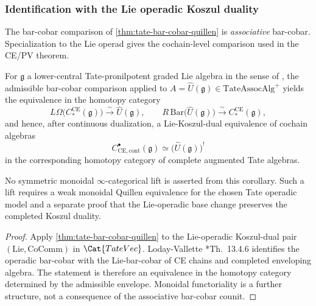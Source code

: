 \subsubsection{Identification with the Lie operadic Koszul duality}

The bar-cobar comparison of \ref{thm:tate-bar-cobar-quillen} is
\emph{associative} bar-cobar.  Specialization to the Lie operad
gives the cochain-level comparison used in the CE/PV theorem.

\begin{cor}
  \label{cor:tate-lie-bar-cobar}
  For $\mathfrak g$ a lower-central Tate-pronilpotent graded Lie algebra in the
  sense of \alpharef, the admissible bar-cobar comparison applied
  to $A=\widehat U(\mathfrak g)\in\mathrm{TateAssocAlg}^+$ yields
  the equivalence in the homotopy category
  $$L\Omega\bigl(C_*^{\mathrm{CE}}(\mathfrak g)\bigr)
    \xrightarrow{\sim}\widehat U(\mathfrak g),\qquad
    R\,\mathrm{Bar}\bigl(\widehat U(\mathfrak g)\bigr)
    \xrightarrow{\sim}C_*^{\mathrm{CE}}(\mathfrak g),$$
  and hence, after continuous dualization, a Lie-Koszul-dual equivalence
  of cochain algebras
  $$C^\bullet_{\mathrm{CE},\mathrm{cont}}(\mathfrak g)
    \simeq\bigl(\widehat U(\mathfrak g)\bigr)^!$$
  in the corresponding homotopy category of complete augmented
  Tate algebras.

	  No symmetric monoidal $\infty$-categorical lift is asserted from
	  this corollary.  Such a lift requires a weak monoidal Quillen
	  equivalence for the chosen Tate operadic model and a separate
	  proof that the Lie-operadic base change preserves the completed
	  Koszul duality.
\end{cor}

\begin{proof}
  Apply \ref{thm:tate-bar-cobar-quillen} to the
  Lie-operadic Koszul-dual pair $(\mathrm{Lie},\mathrm{CoComm})$
  in $\Cat{TateVec}$. Loday-Vallette \cite{loday-vallette}*{Th.~13.4.6}
  identifies the operadic bar-cobar with the Lie-bar-cobar of
  CE chains and completed enveloping algebra.  The statement is
  therefore an equivalence in the homotopy category determined by the
  admissible envelope.  Monoidal functoriality is a further structure,
  not a consequence of the associative bar-cobar counit.
\end{proof}

